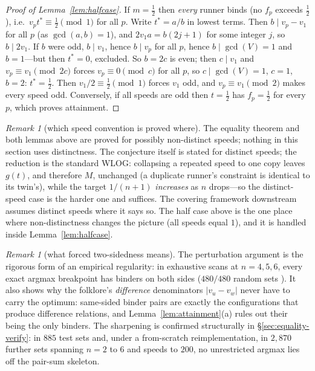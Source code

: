 \documentclass[11pt,a4paper]{article}
\numberwithin{equation}{section}
\theoremstyle{plain}
\theoremstyle{plain}
\theoremstyle{definition}
\theoremstyle{remark}
\newtheorem{remark}[theorem]{Remark}
\begin{document}
\begin{proof}[Proof of Lemma~\ref{lem:halfcase}]
If $m=\tfrac12$ then \emph{every} runner binds (no $f_p$ exceeds
$\tfrac12$), i.e.\ $v_p t^\ast\equiv \tfrac12 \pmod 1$ for all $p$. Write
$t^\ast=a/b$ in lowest terms. Then $b\mid v_p-v_1$ for all $p$ (as
$\gcd(a,b)=1$), and $2v_1 a=b(2j+1)$ for some integer $j$, so $b\mid
2v_1$. If $b$ were odd, $b\mid v_1$, hence $b\mid v_p$ for all $p$, hence
$b\mid\gcd(V)=1$ and $b=1$---but then $t^\ast=0$, excluded. So $b=2c$ is
even; then $c\mid v_1$ and $v_p\equiv v_1\pmod{2c}$ forces
$v_p\equiv 0\pmod c$ for all $p$, so $c\mid\gcd(V)=1$, $c=1$, $b=2$:
$t^\ast=\tfrac12$. Then $v_1/2\equiv\tfrac12\pmod 1$ forces $v_1$ odd,
and $v_p\equiv v_1\pmod 2$ makes every speed odd. Conversely, if all
speeds are odd then $t=\tfrac12$ has $f_p=\tfrac12$ for every $p$,
which proves attainment.
\end{proof}

\begin{remark}[which speed convention is proved where]
The equality theorem and both lemmas above are proved for possibly
non-distinct speeds; nothing in this section uses distinctness. The
conjecture itself is stated for distinct speeds; the reduction is the
standard WLOG: collapsing a repeated speed to one copy leaves $g(t)$,
and therefore $M$, unchanged (a duplicate runner's constraint is
identical to its twin's), while the target $1/(n{+}1)$ \emph{increases}
as $n$ drops---so the distinct-speed case is the harder one and suffices.
The covering framework downstream assumes distinct speeds where it says
so. The half case above is the one place where non-distinctness changes
the picture (all speeds equal $1$), and it is handled inside
Lemma~\ref{lem:halfcase}.
\end{remark}

\begin{remark}[what forced two-sidedness means]\label{rem:twosided}
The perturbation argument is the rigorous form of an empirical
regularity: in exhaustive scans at $n=4,5,6$, every exact argmax
breakpoint has binders on both sides ($480/480$ random sets
\cite{prog-artifacts}). It also shows why the folklore's
\emph{difference} denominators $|v_u-v_w|$ never have to carry the
optimum: same-sided binder pairs are exactly the configurations that
produce difference relations, and Lemma~\ref{lem:attainment}(a) rules out
their being the only binders. The sharpening is confirmed structurally in
\S\ref{sec:equality-verify}: in $885$ test sets and, under a from-scratch
reimplementation, in $2{,}870$ further sets spanning $n=2$ to $6$ and
speeds to $200$, no unrestricted argmax lies off the pair-sum skeleton.
\end{remark}
\end{document}
